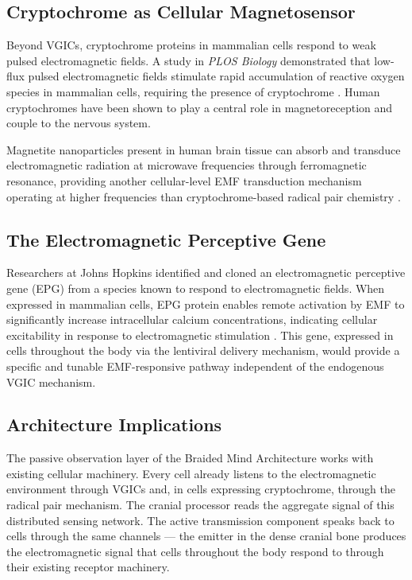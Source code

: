 \documentclass[12pt]{article}
\begin{document}
\subsection{Cryptochrome as Cellular Magnetosensor}

Beyond VGICs, cryptochrome proteins in mammalian cells respond to weak pulsed electromagnetic fields. A study in \textit{PLOS Biology} demonstrated that low-flux pulsed electromagnetic fields stimulate rapid accumulation of reactive oxygen species in mammalian cells, requiring the presence of cryptochrome \cite{cryptochrome_emf_2018}. Human cryptochromes have been shown to play a central role in magnetoreception and couple to the nervous system.

Magnetite nanoparticles present in human brain tissue can absorb and transduce electromagnetic radiation at microwave frequencies through ferromagnetic resonance, providing another cellular-level EMF transduction mechanism operating at higher frequencies than cryptochrome-based radical pair chemistry \cite{magnetoreception_human_2024}.

\subsection{The Electromagnetic Perceptive Gene}

Researchers at Johns Hopkins identified and cloned an electromagnetic perceptive gene (EPG) from a species known to respond to electromagnetic fields. When expressed in mammalian cells, EPG protein enables remote activation by EMF to significantly increase intracellular calcium concentrations, indicating cellular excitability in response to electromagnetic stimulation \cite{epg_wireless_2018}. This gene, expressed in cells throughout the body via the lentiviral delivery mechanism, would provide a specific and tunable EMF-responsive pathway independent of the endogenous VGIC mechanism.

\subsection{Architecture Implications}

The passive observation layer of the Braided Mind Architecture works with existing cellular machinery. Every cell already listens to the electromagnetic environment through VGICs and, in cells expressing cryptochrome, through the radical pair mechanism. The cranial processor reads the aggregate signal of this distributed sensing network. The active transmission component speaks back to cells through the same channels --- the emitter in the dense cranial bone produces the electromagnetic signal that cells throughout the body respond to through their existing receptor machinery.
\end{document}
